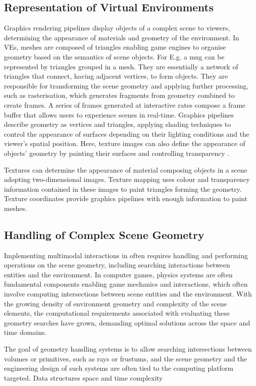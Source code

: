 \subsection{Representation of Virtual Environments}
Graphics rendering pipelines display objects of a complex scene to viewers, determining the appearance of materials and geometry of the environment. In VEs, meshes are composed of triangles enabling game engines to organise geometry based on the semantics of scene objects. For E.g. a mug can be represented by triangles grouped in a mesh. They are essentially a network of triangles that connect, having adjacent vertices, to form objects. They are responsible for transforming the scene geometry and applying further processing, such as rasterisation, which generates fragments from geometry combined to create frames. A series of frames generated at interactive rates compose a frame buffer that allows users to experience scenes in real-time. Graphics pipelines describe geometry as vertices and triangles, applying shading techniques to control the appearance of surfaces depending on their lighting conditions and the viewer’s spatial position. Here, texture images can also define the appearance of objects' geometry by painting their surfaces and controlling transparency \citep{mcallister2002efficient, marschner2015fundamentals}.\par
Textures can determine the appearance of material composing objects in a scene adopting two-dimensional images. Texture mapping uses colour and transparency information contained in these images to paint triangles forming the geometry. Texture coordinates provide graphics pipelines with enough information to paint meshes.

\subsection{Handling of Complex Scene Geometry}\label{sec:bg-geometry-handling}
Implementing multimodal interactions in  often requires handling and performing operations on the scene geometry, including searching interactions between entities and the environment. In computer games, physics systems are often fundamental components enabling game mechanics and interactions, which often involve computing intersections between scene entities and the environment. With the growing density of environment geometry and complexity of the scene elements, the computational requirements associated with evaluating these geometry searches have grown, demanding optimal solutions across the space and time domains.\par
The goal of geometry handling systems is to allow searching intersections between volumes or primitives, such as rays or frustums, and the scene geometry and the engineering design of such systems are often tied to the computing platform targeted.
Data structures space and time complexity



